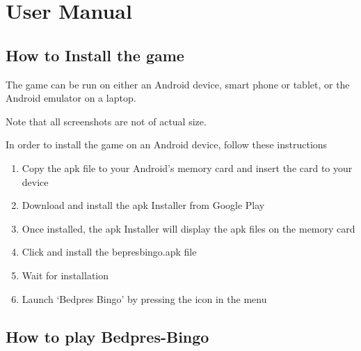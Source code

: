 \section{User Manual}
\label{usermanual}

\subsection{How to Install the game}
The game can be run on either an Android device, smart phone or tablet, or
the Android emulator on a laptop.

Note that all screenshots are not of actual size.

In order to install the game on an Android device, follow these instructions
\begin{enumerate}
\item Copy the apk file to your Android's memory card and insert the card to
your device
\item Download and install the apk Installer from Google Play\cite{website:apk}
\item Once installed, the apk Installer will display the apk files on the
memory card
\item Click and install the bepresbingo.apk file
\item Wait for installation 
\item Launch `Bedpres Bingo' by pressing the icon in the menu
\end{enumerate}

\subsection{How to play Bedpres-Bingo}

